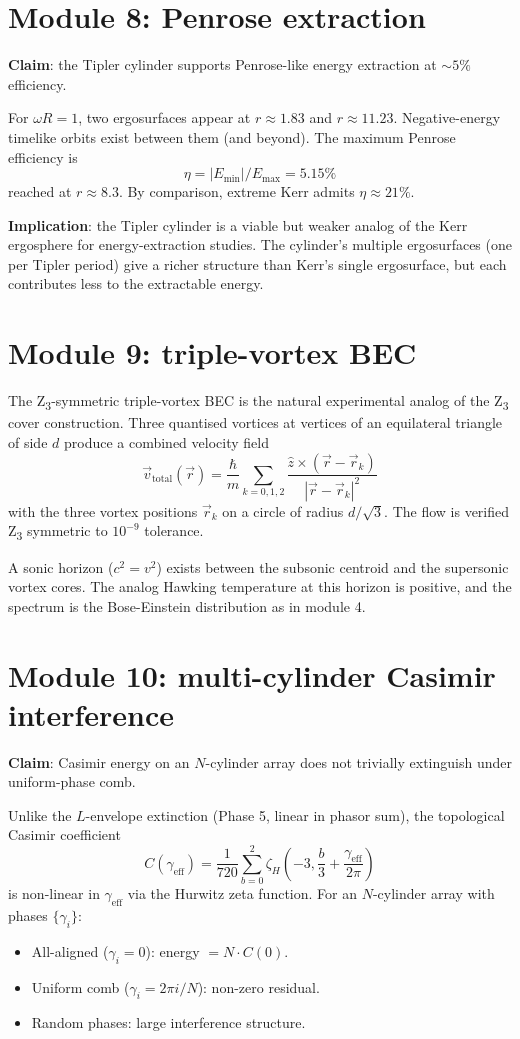 \documentclass[11pt,a4paper]{article}
\begin{document}
\section{Module 8: Penrose extraction}

\textbf{Claim}: the Tipler cylinder supports Penrose-like
energy extraction at $\sim 5\%$ efficiency.

For $\omega R = 1$, two ergosurfaces appear at $r \approx 1.83$ and
$r \approx 11.23$. Negative-energy timelike orbits exist between
them (and beyond). The maximum Penrose efficiency is
\[
\eta = |E_\text{min}| / E_\text{max} = 5.15\%
\]
reached at $r \approx 8.3$. By comparison, extreme Kerr admits
$\eta \approx 21\%$.

\textbf{Implication}: the Tipler cylinder is a viable but weaker
analog of the Kerr ergosphere for energy-extraction studies. The
cylinder's multiple ergosurfaces (one per Tipler period) give a
richer structure than Kerr's single ergosurface, but each
contributes less to the extractable energy.

\section{Module 9: triple-vortex BEC}

The Z\textsubscript{3}-symmetric triple-vortex BEC is the natural
experimental analog of the Z\textsubscript{3} cover construction.
Three quantised vortices at vertices of an equilateral triangle of
side $d$ produce a combined velocity field
\[
\vec v_\text{total}(\vec r) = \frac{\hbar}{m} \sum_{k=0,1,2} \frac{\hat z \times (\vec r - \vec r_k)}{|\vec r - \vec r_k|^2}
\]
with the three vortex positions $\vec r_k$ on a circle of radius
$d / \sqrt 3$. The flow is verified Z\textsubscript{3} symmetric to
$10^{-9}$ tolerance.

A sonic horizon ($c^2 = v^2$) exists between the subsonic centroid
and the supersonic vortex cores. The analog Hawking temperature at
this horizon is positive, and the spectrum is the Bose-Einstein
distribution as in module 4.

\section{Module 10: multi-cylinder Casimir interference}

\textbf{Claim}: Casimir energy on an $N$-cylinder array does not
trivially extinguish under uniform-phase comb.

Unlike the $L$-envelope extinction (Phase 5, linear in phasor sum),
the topological Casimir coefficient
\[
C(\gamma_\text{eff}) = \frac{1}{720} \sum_{b=0}^{2}
\zeta_H\!\left(-3, \frac{b}{3} + \frac{\gamma_\text{eff}}{2\pi}\right)
\]
is non-linear in $\gamma_\text{eff}$ via the Hurwitz zeta function.
For an $N$-cylinder array with phases $\{\gamma_i\}$:
\begin{itemize}
\item All-aligned ($\gamma_i = 0$): energy $= N \cdot C(0)$.
\item Uniform comb ($\gamma_i = 2\pi i / N$): non-zero residual.
\item Random phases: large interference structure.
\end{itemize}
\end{document}
